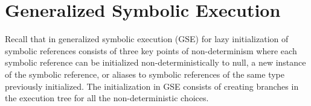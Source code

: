 \section{Generalized Symbolic Execution}

Recall that in generalized symbolic execution (GSE) for lazy
initialization of symbolic references consists of three key points of
non-determinism where each symbolic reference can be initialized
non-deterministically to null, a new instance of the symbolic
reference, or aliases to symbolic references of the same type
previously initialized. The initialization in GSE consists of creating
branches in the execution tree for all the non-deterministic choices.











